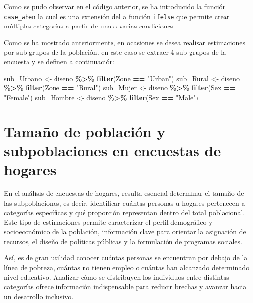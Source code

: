 \documentclass[
  12pt,
]{book}
\newenvironment{Shaded}{\begin{snugshade}}{\end{snugshade}}
\newcommand{\FunctionTok}[1]{\textcolor[rgb]{0.13,0.29,0.53}{\textbf{#1}}}
\newcommand{\NormalTok}[1]{#1}
\newcommand{\OtherTok}[1]{\textcolor[rgb]{0.56,0.35,0.01}{#1}}
\newcommand{\SpecialCharTok}[1]{\textcolor[rgb]{0.81,0.36,0.00}{\textbf{#1}}}
\newcommand{\StringTok}[1]{\textcolor[rgb]{0.31,0.60,0.02}{#1}}
\begin{document}
Como se pudo observar en el código anterior, se ha introducido la función \texttt{case\_when} la cual es una extensión del a función \texttt{ifelse} que permite crear múltiples categorías a partir de una o varias condiciones.

Como se ha mostrado anteriormente, en ocasiones se desea realizar estimaciones por sub-grupos de la población, en este caso se extraer 4 sub-grupos de la encuesta y se definen a continuación:

\begin{Shaded}
\begin{Highlighting}[]
\NormalTok{sub\_Urbano }\OtherTok{\textless{}{-}}\NormalTok{ diseno }\SpecialCharTok{\%\textgreater{}\%}  \FunctionTok{filter}\NormalTok{(Zone }\SpecialCharTok{==} \StringTok{"Urban"}\NormalTok{)}
\NormalTok{sub\_Rural  }\OtherTok{\textless{}{-}}\NormalTok{ diseno }\SpecialCharTok{\%\textgreater{}\%}  \FunctionTok{filter}\NormalTok{(Zone }\SpecialCharTok{==} \StringTok{"Rural"}\NormalTok{)}
\NormalTok{sub\_Mujer  }\OtherTok{\textless{}{-}}\NormalTok{ diseno }\SpecialCharTok{\%\textgreater{}\%}  \FunctionTok{filter}\NormalTok{(Sex }\SpecialCharTok{==} \StringTok{"Female"}\NormalTok{)}
\NormalTok{sub\_Hombre }\OtherTok{\textless{}{-}}\NormalTok{ diseno }\SpecialCharTok{\%\textgreater{}\%}  \FunctionTok{filter}\NormalTok{(Sex }\SpecialCharTok{==} \StringTok{"Male"}\NormalTok{)}
\end{Highlighting}
\end{Shaded}

\section{Tamaño de población y subpoblaciones en encuestas de hogares}\label{tamauxf1o-de-poblaciuxf3n-y-subpoblaciones-en-encuestas-de-hogares}

En el análisis de encuestas de hogares, resulta esencial determinar el tamaño de las subpoblaciones, es decir, identificar cuántas personas u hogares pertenecen a categorías específicas y qué proporción representan dentro del total poblacional. Este tipo de estimaciones permite caracterizar el perfil demográfico y socioeconómico de la población, información clave para orientar la asignación de recursos, el diseño de políticas públicas y la formulación de programas sociales.

Así, es de gran utilidad conocer cuántas personas se encuentran por debajo de la línea de pobreza, cuántas no tienen empleo o cuántas han alcanzado determinado nivel educativo. Analizar cómo se distribuyen los individuos entre distintas categorías ofrece información indispensable para reducir brechas y avanzar hacia un desarrollo inclusivo.
\end{document}

